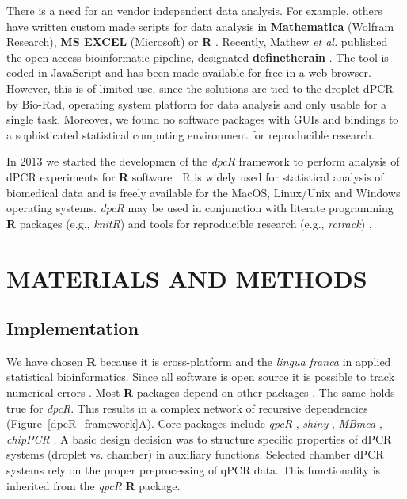 \documentclass[a4,center,fleqn]{NAR}
\begin{document}
There is a need for an vendor independent data analysis. For example, others 
have written custom made scripts for data analysis in \textbf{Mathematica} 
(Wolfram Research), \textbf{MS EXCEL} (Microsoft) or \textbf{R} 
\cite{strain_highly_2013, dreo_optimising_2014, trypsteen_ddpcrquant_2015, 
dobnik_multiplex_2015}. Recently, Mathew \textit{et al.} published the open 
access bioinformatic pipeline, designated \textbf{definetherain} 
\cite{jones_low_2014}. The tool is coded in JavaScript and has been made 
available for free in a web browser. However, this is of limited use, since the 
solutions are tied to the droplet dPCR by Bio-Rad, 
operating system platform for data analysis and only usable for a single task. 
Moreover, we found no software packages with GUIs and bindings to a 
sophisticated statistical computing environment for reproducible research. 

In 2013 we started the developmen of the \textit{dpcR} framework to perform 
analysis of dPCR experiments for \textbf{R} software 
\citep{burdukiewicz_dpcr:_2013}. R is widely used for statistical analysis of 
biomedical data and is freely available for the MacOS, Linux/Unix and Windows 
operating systems. \textit{dpcR}  may be used in conjunction with literate 
programming \textbf{R} packages (e.g., \textit{knitR}) and tools for 
reproducible research (e.g.,  \textit{rctrack}) \cite{liu_r_2014, 
rodiger_r_2015}. 

\section{MATERIALS AND METHODS}

\subsection{Implementation}

We have chosen \textbf{R} because it is cross-platform and the \textit{lingua 
franca} in applied statistical bioinformatics. Since all software is open source 
it is possible to track numerical errors \cite{rodiger_rkward_2012, 
rodiger_r_2015}. Most \textbf{R} packages depend on other packages 
\cite{ooms_2013}. The same holds true for \textit{dpcR}. This results in a 
complex network of recursive dependencies (Figure~\ref{dpcR_framework}A). Core 
packages include \textit{qpcR} \cite{ritz_qpcr_2008}, \textit{shiny} 
\cite{shiny}, \textit{MBmca} \cite{rodiger_surface_2013}, \textit{chipPCR} 
\cite{roediger2015chippcr}. A basic design decision was to structure specific 
properties of dPCR systems (droplet vs. chamber) in auxiliary functions. Selected 
chamber dPCR systems rely on the proper preprocessing of qPCR data. This 
functionality is inherited from the \textit{qpcR} \textbf{R} package.
\end{document}
